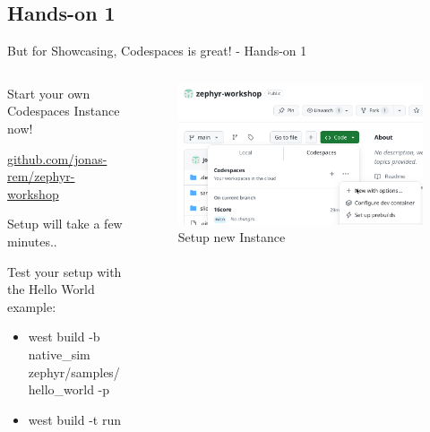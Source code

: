 \documentclass[10pt, aspectratio=169]{beamer}
\begin{document}
\subsection{Hands-on 1}
\begin{frame}[fragile]{But for Showcasing, Codespaces is great! - Hands-on 1}
  \begin{columns}
    \begin{column}{0.6\textwidth}
            Start your own Codespaces Instance now! \footnotemark[1] \footnotemark[2]

      \href{https://github.com/jonas-rem/zephyr-workshop}{github.com/jonas-rem/zephyr-workshop}

      Setup will take a few minutes..

      Test your setup with the Hello World example:
      \begin{itemize}
        \item \scriptsize west build -b native\_sim zephyr/samples/hello\_world -p
        \item \scriptsize west build -t run
      \end{itemize}
    \end{column}
    \begin{column}{0.4\textwidth}
      \begin{figure}
        \includegraphics[width=1.1\textwidth]{images/codespaces_setting_up_class.png}
        \caption*{Setup new Instance}
      \end{figure}
    \end{column}
  \end{columns}
\end{frame}
\end{document}
